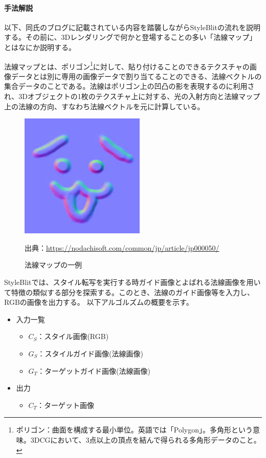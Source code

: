 \documentclass[dvipdfmx]{jsarticle}
\begin{document}
\paragraph{手法解説}
以下、同氏のブログに記載されている内容を踏襲しながらStyleBlitの流れを説明する。その前に、3Dレンダリングで何かと登場することの多い「法線マップ」とはなにか説明する。\par
法線マップとは、ポリゴン\footnote{ポリゴン：曲面を構成する最小単位。英語では「Polygon」。多角形という意味。3DCGにおいて、3点以上の頂点を結んで得られる多角形データのこと。}に対して、貼り付けることのできるテクスチャの画像データとは別に専用の画像データで割り当てることのできる、法線ベクトルの集合データのことである。法線はポリゴン上の凹凸の影を表現するのに利用され、3Dオブジェクトの1枚のテクスチャ上に対する、光の入射方向と法線マップ上の法線の方向、すなわち法線ベクトルを元に計算している。\par
\begin{figure}[H]
  \centering
  \includegraphics[scale=0.4]{images/hosenmap.jpeg}
  \caption{法線マップの一例}
  出典：\url{https://nodachisoft.com/common/jp/article/jp000050/}
\end{figure}
StyleBlitでは、スタイル転写を実行する時ガイド画像とよばれる法線画像を用いて特徴の類似する部分を探索する。このとき、法線のガイド画像等を入力し、RGBの画像を出力する。
以下アルゴルズムの概要を示す。\par
\begin{itemize}
  \item 入力一覧
  \begin{itemize}
    \item $C_{S}$：スタイル画像(RGB)
    \item $G_{S}$：スタイルガイド画像(法線画像)
    \item $G_{T}$：ターゲットガイド画像(法線画像)
  \end{itemize}
  \item 出力
  \begin{itemize}
    \item $C_{T}$：ターゲット画像
  \end{itemize}
\end{itemize}
\end{document}
